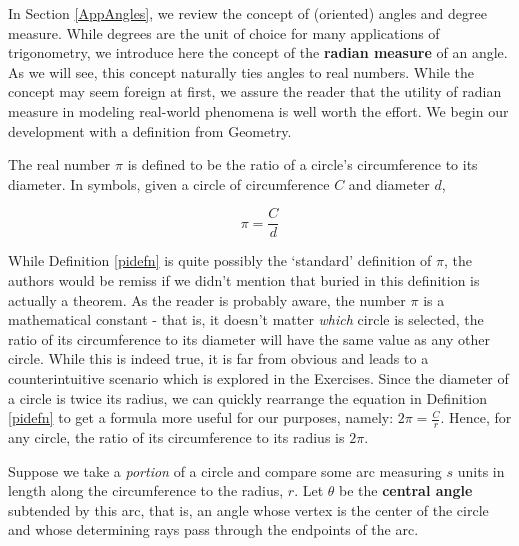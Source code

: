 \documentclass{ximera}
\begin{document}
	\author{Stitz-Zeager}




\setcounter{footnote}{0}

\label{RadianMeasure}

In Section \ref{AppAngles},  we review the concept of (oriented) angles and degree measure.  While  degrees are the unit of choice for many applications of trigonometry, we introduce here the concept of the \textbf{radian measure} of an angle.  As we will see, this concept naturally ties angles to real numbers.  While the concept may seem foreign at first, we assure the reader that the utility of radian measure in modeling real-world phenomena is well worth the effort.  We begin our development with a definition from Geometry.





\begin{definition} \label{pidefn}  The real number $\pi$ is defined to be the ratio of a circle's circumference to its diameter.  In symbols, given a circle of circumference $C$ and diameter $d$, 

\[ \pi = \frac{C}{d} \]

\end{definition}




While Definition \ref{pidefn} is quite possibly the `standard' definition of $\pi$, the authors would be remiss if we didn't mention that buried in this definition is actually a theorem.  As the reader is probably aware, the number $\pi$ is a mathematical constant - that is, it doesn't matter \textit{which} circle is selected, the ratio of its circumference to its diameter will have the same value as any other circle.  While this is indeed true, it is far from obvious and leads to a  counterintuitive scenario which is explored in the Exercises.   Since the diameter of a circle is twice its radius, we can quickly rearrange the equation in Definition \ref{pidefn} to get a formula more useful for our purposes, namely: $2 \pi = \frac{C}{r}$.  Hence, for any circle,  the ratio of its circumference to its radius is $2\pi$.

Suppose we take a \textit{portion} of a circle and compare some arc measuring $s$ units in length along the circumference to the radius, $r$.  Let $\theta$ be the \textbf{central angle} subtended by this arc, that is, an angle whose vertex is the center of the circle and whose determining rays pass through the endpoints of the arc.  
\end{document}
